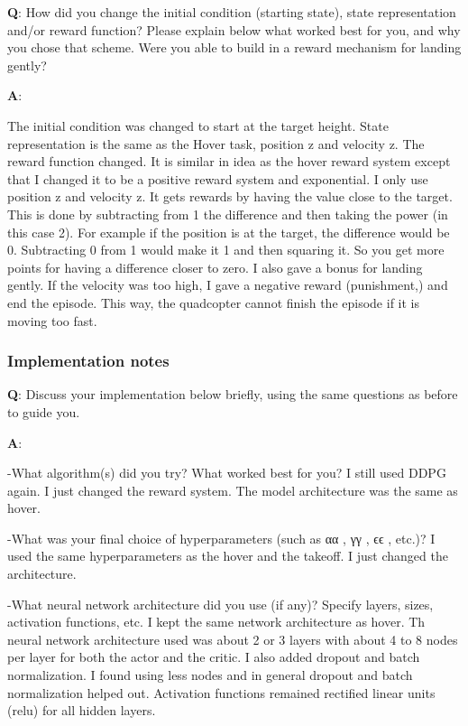 \documentclass[11pt]{article}
\begin{document}
\textbf{Q}: How did you change the initial condition (starting state),
state representation and/or reward function? Please explain below what
worked best for you, and why you chose that scheme. Were you able to
build in a reward mechanism for landing gently?

\textbf{A}:

The initial condition was changed to start at the target height. State
representation is the same as the Hover task, position z and velocity z.
The reward function changed. It is similar in idea as the hover reward
system except that I changed it to be a positive reward system and
exponential. I only use position z and velocity z. It gets rewards by
having the value close to the target. This is done by subtracting from 1
the difference and then taking the power (in this case 2). For example
if the position is at the target, the difference would be 0. Subtracting
0 from 1 would make it 1 and then squaring it. So you get more points
for having a difference closer to zero. I also gave a bonus for landing
gently. If the velocity was too high, I gave a negative reward
(punishment,) and end the episode. This way, the quadcopter cannot
finish the episode if it is moving too fast.

\subsubsection{Implementation notes}\label{implementation-notes}

\textbf{Q}: Discuss your implementation below briefly, using the same
questions as before to guide you.

\textbf{A}:

-What algorithm(s) did you try? What worked best for you? I still used
DDPG again. I just changed the reward system. The model architecture was
the same as hover.

-What was your final choice of hyperparameters (such as αα , γγ , ϵϵ ,
etc.)? I used the same hyperparameters as the hover and the takeoff. I
just changed the architecture.

-What neural network architecture did you use (if any)? Specify layers,
sizes, activation functions, etc. I kept the same network architecture
as hover. Th neural network architecture used was about 2 or 3 layers
with about 4 to 8 nodes per layer for both the actor and the critic. I
also added dropout and batch normalization. I found using less nodes and
in general dropout and batch normalization helped out. Activation
functions remained rectified linear units (relu) for all hidden layers.
\end{document}
